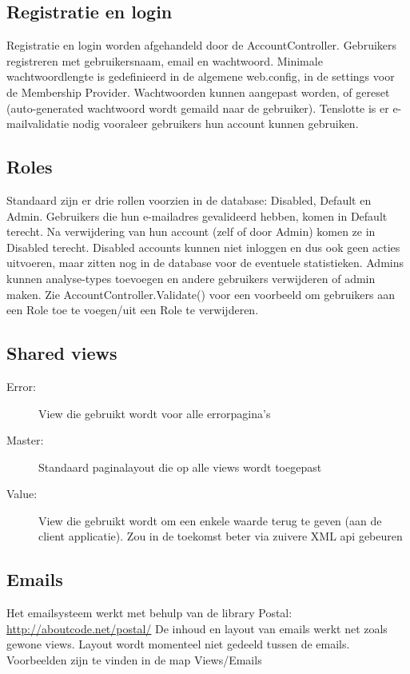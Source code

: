\documentclass[a4paper,11pt]{report}
\begin{document}
\subsection{Registratie en login}
Registratie en login worden afgehandeld door de AccountController.
Gebruikers registreren met gebruikersnaam, email en wachtwoord. Minimale wachtwoordlengte is gedefinieerd in de algemene web.config, in de settings voor de Membership Provider. Wachtwoorden kunnen aangepast worden, of gereset (auto-generated wachtwoord wordt gemaild naar de gebruiker). Tenslotte is er e-mailvalidatie nodig vooraleer gebruikers hun account kunnen gebruiken.
\subsection{Roles}
Standaard zijn er drie rollen voorzien in de database: Disabled, Default en Admin. Gebruikers die hun e-mailadres gevalideerd hebben, komen in Default terecht. Na verwijdering van hun account (zelf of door Admin) komen ze in Disabled terecht. Disabled accounts kunnen niet inloggen en dus ook geen acties uitvoeren, maar zitten nog in de database voor de eventuele statistieken. Admins kunnen analyse-types toevoegen en andere gebruikers verwijderen of admin maken.
Zie AccountController.Validate() voor een voorbeeld om gebruikers aan een Role toe te voegen/uit een Role te verwijderen.
\subsection{Shared views}
\begin{description}
	\item [Error:] View die gebruikt wordt voor alle errorpagina's
	\item [Master:] Standaard paginalayout die op alle views wordt toegepast
	\item [Value:] View die gebruikt wordt om een enkele waarde terug te geven (aan de client applicatie). Zou in de toekomst beter via zuivere XML api gebeuren
\end{description}
\subsection{Emails}
Het emailsysteem werkt met behulp van de library Postal:\\
\href{http://aboutcode.net/postal/}{http://aboutcode.net/postal/}
De inhoud en layout van emails werkt net zoals gewone views. Layout wordt momenteel niet gedeeld tussen de emails. Voorbeelden zijn te vinden in de map Views/Emails
\end{document}

